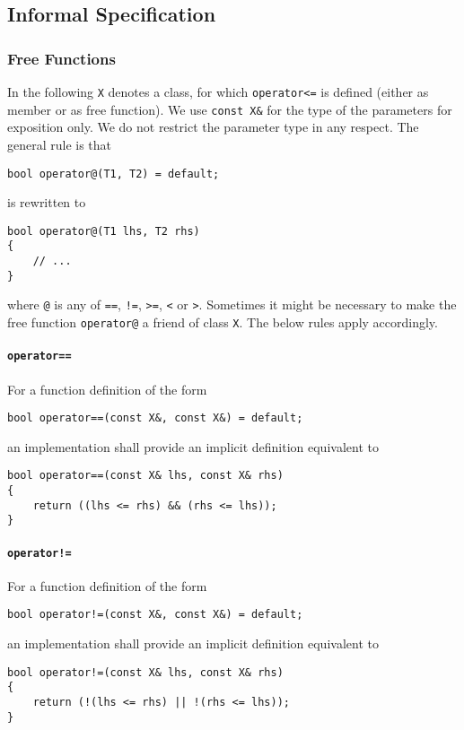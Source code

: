 ﻿\documentclass[a4paper,11pt,final]{article}
\begin{document}
\subsection{Informal Specification}
\subsubsection{Free Functions}
In the following \verb|X| denotes a class, for which \verb|operator<=| is defined (either as member or as free function). We use \verb|const X&| for the type of the parameters for exposition only. We do not restrict the parameter type in any respect. The general rule is that
\begin{verbatim}
bool operator@(T1, T2) = default;
\end{verbatim}
is rewritten to
\begin{verbatim}
bool operator@(T1 lhs, T2 rhs)
{
    // ...
}
\end{verbatim}
where \verb|@| is any of \verb|==|, \verb|!=|, \verb|>=|, \verb|<| or \verb|>|. Sometimes it might be necessary to make the free function \verb|operator@| a friend of class \verb|X|. The below rules apply accordingly.

\paragraph{\texttt{operator==}}
For a function definition of the form
\begin{verbatim}
bool operator==(const X&, const X&) = default;
\end{verbatim}
an implementation shall provide an implicit definition equivalent to
\begin{verbatim}
bool operator==(const X& lhs, const X& rhs)
{
    return ((lhs <= rhs) && (rhs <= lhs));
}
\end{verbatim}

\paragraph{\texttt{operator!=}}
For a function definition of the form
\begin{verbatim}
bool operator!=(const X&, const X&) = default;
\end{verbatim}
an implementation shall provide an implicit definition equivalent to
\begin{verbatim}
bool operator!=(const X& lhs, const X& rhs)
{
    return (!(lhs <= rhs) || !(rhs <= lhs));
}
\end{verbatim}
\end{document}
